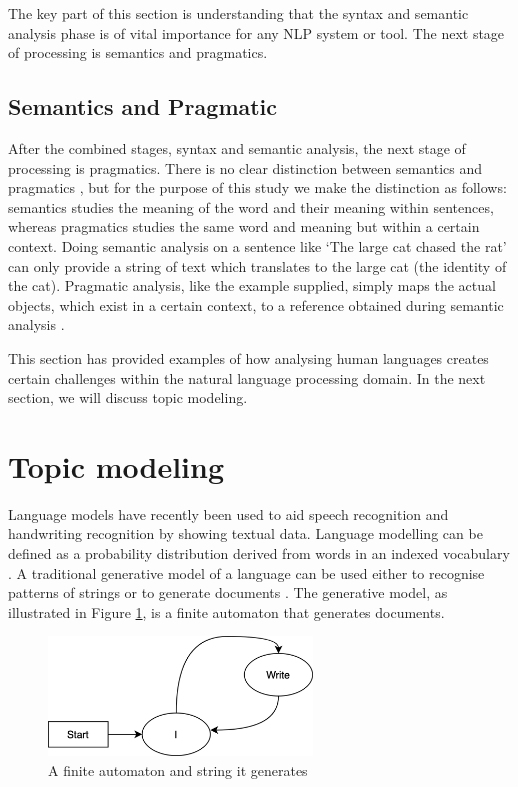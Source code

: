 The key part of this section is understanding that the syntax and semantic analysis phase is of vital importance for any NLP system or tool.
The next stage of processing is semantics and pragmatics.

\subsection{Semantics and Pragmatic}

After the combined stages, syntax and semantic analysis, the next stage of processing is pragmatics. There is no clear distinction between semantics and pragmatics \cite{Stern2004}, but for the purpose of this study we make the distinction as follows: semantics studies the meaning of the word and their meaning within sentences, whereas pragmatics studies the same word and meaning but within a certain context. Doing semantic analysis on a sentence like ‘The large cat chased the rat’ can only provide a string of text which translates to the large cat (the identity of the cat). Pragmatic analysis, like the example supplied, simply maps the actual objects, which exist in a certain context, to a reference obtained during semantic analysis \cite{russell2016artificial}.

This section has provided examples of how analysing human languages creates certain challenges within the natural language processing domain.
In the next section, we will discuss topic modeling.

\section{Topic modeling} \label{ssec:tmodel}

Language models have recently been used to aid speech recognition and handwriting recognition by showing textual data. Language modelling can be defined as a probability distribution derived from words in an indexed vocabulary \cite{croft2010search}. 
A traditional generative model of a language can be used either to recognise patterns of strings or to generate documents \cite{Sajjadi2018AssessingGM}. 
The generative model, as illustrated in Figure \ref{fig:automon}, is a finite automaton that generates documents. 

\begin{figure}[htbp]
\centering
\includegraphics[width=7cm]{./figures/automon8.png}
\caption{A finite automaton and string it generates}
\label{fig:automon}
\end{figure}

